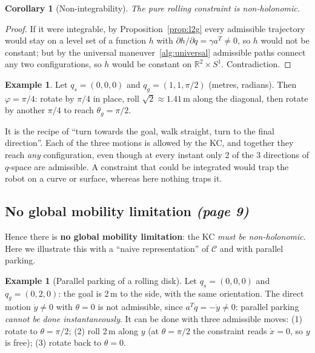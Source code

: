 \documentclass[11pt,a4paper]{article}
\theoremstyle{definition}
\newtheorem{example}[definition]{Example}
\theoremstyle{plain}
\newtheorem{corollary}[definition]{Corollary}
\theoremstyle{remark}
\begin{document}
\begin{corollary}[Non-integrability]
The pure rolling constraint is non-holonomic.
\end{corollary}
\begin{proof}
If it were integrable, by Proposition~\ref{prop:l2g} every admissible trajectory would stay on a level set of a function $h$ with $\partial h/\partial q=\gamma a^{T}\neq0$, so $h$ would not be constant; but by the universal maneuver~\ref{alg:universal} admissible paths connect any two configurations, so $h$ would be constant on $\mathbb R^2\times S^1$. Contradiction.
\end{proof}
 
\begin{example}
Let $q_s=(0,0,0)$ and $q_g=(1,1,\pi/2)$ (metres, radians). Then $\varphi=\pi/4$: rotate by $\pi/4$ in place, roll $\sqrt2\approx1.41$\,m along the diagonal, then rotate by another $\pi/4$ to reach $\theta_g=\pi/2$.
\end{example}
 
\begin{intuition}
It is the recipe of ``turn towards the goal, walk straight, turn to the final direction''. Each of the three motions is allowed by the KC, and together they reach \emph{any} configuration, even though at every instant only 2 of the 3 directions of $q$-space are admissible. A constraint that could be integrated would trap the robot on a curve or surface, whereas here nothing traps it.
\end{intuition}
 
\subsection{No global mobility limitation \emph{(page 9)}}
 
Hence there is \textbf{no global mobility limitation}: the KC \emph{must be non-holonomic}. Here we illustrate this with a ``naive representation'' of $\mathcal C$ and with parallel parking.
 
\begin{example}[Parallel parking of a rolling disk]
Let $q_s=(0,0,0)$ and $q_g=(0,2,0)$: the goal is 2\,m to the side, with the same orientation. The direct motion $\dot y\neq0$ with $\theta=0$ is not admissible, since $a^{T}\dot q=-\dot y\neq0$: parallel parking \emph{cannot be done instantaneously}. It can be done with three admissible moves: (1) rotate to $\theta=\pi/2$; (2) roll 2\,m along $y$ (at $\theta=\pi/2$ the constraint reads $\dot x=0$, so $y$ is free); (3) rotate back to $\theta=0$.
\end{example}
 
\end{document}
